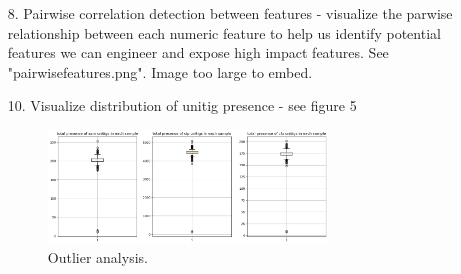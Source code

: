 \documentclass[manuscript,screen,review, nonacm]{acmart}
\begin{document}
\begin{itemize}
    \item[8.] Pairwise correlation detection between features - visualize the parwise relationship between each numeric feature to help us identify 
    potential features we can engineer and expose high impact features. See "pairwisefeatures.png". Image too large to embed. 


    \item[10.] Visualize distribution of unitig presence - see figure 5

         \begin{figure}[H]
                \centering
                \vspace{-10pt}
                \includegraphics[width=0.7\textwidth]{figures/unitigdis.png}
                \caption{Outlier analysis.}
                \vspace{-10pt}
        \end{figure}



\end{itemize}
\end{document}
